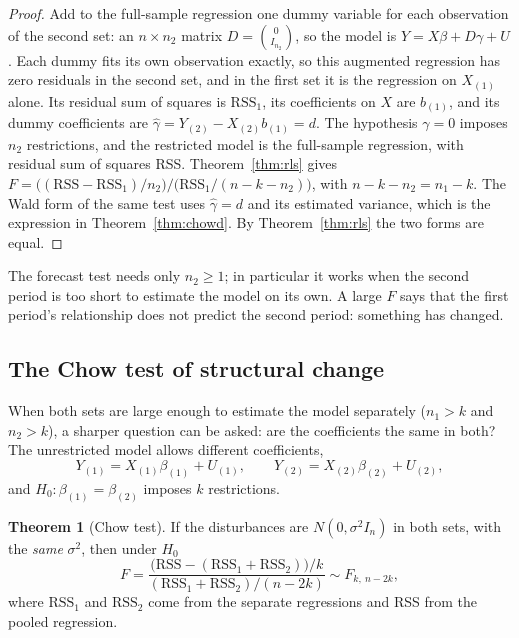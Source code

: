 \documentclass[11pt,a4paper]{article}
\numberwithin{equation}{section}
\theoremstyle{definition}
\newtheorem{thm}{Theorem}[subsection]
\begin{document}
\begin{proof}
Add to the full-sample regression one dummy variable for each observation of the second set: an $n \times n_2$ matrix $D = \binom{0}{I_{n_2}}$, so the model
is $Y = X\beta + D\gamma + U$. Each dummy fits its own observation exactly, so this augmented regression has zero residuals in the second set, and in
the first set it is the regression on $X_{(1)}$ alone. Its residual sum of squares is $\text{RSS}_1$, its coefficients on $X$ are $b_{(1)}$, and its dummy
coefficients are $\hat\gamma = Y_{(2)} - X_{(2)}b_{(1)} = d$. The hypothesis $\gamma = 0$ imposes $n_2$ restrictions, and the restricted model is the full-sample
regression, with residual sum of squares RSS. Theorem~\ref{thm:rls} gives $F = \bigl((\text{RSS} - \text{RSS}_1)/n_2\bigr)\big/\bigl(\text{RSS}_1/(n - k - n_2)\bigr)$, with
$n - k - n_2 = n_1 - k$. The Wald form of the same test uses $\hat\gamma = d$ and its estimated variance, which is the expression in Theorem~\ref{thm:chowd}. By
Theorem~\ref{thm:rls} the two forms are equal.
\end{proof}

The forecast test needs only $n_2 \geq 1$; in particular it works when the second period is too short to estimate the model on its own. A large $F$
says that the first period's relationship does not predict the second period: something has changed.

\subsection{The Chow test of structural change}
\label{ssec:chowb}

When both sets are large enough to estimate the model separately ($n_1 > k$ and $n_2 > k$), a sharper question can be asked: are the coefficients the
same in both? The unrestricted model allows different coefficients,
\[
Y_{(1)} = X_{(1)}\beta_{(1)} + U_{(1)}, \qquad Y_{(2)} = X_{(2)}\beta_{(2)} + U_{(2)} ,
\]
and $H_0\colon \beta_{(1)} = \beta_{(2)}$ imposes $k$ restrictions.

\begin{thm}[Chow test]
\label{thm:chowbreak}
If the disturbances are $N(0, \sigma^2I_n)$ in both sets, with the \emph{same} $\sigma^2$, then under $H_0$
\[
F = \frac{\bigl(\text{RSS} - (\text{RSS}_1 + \text{RSS}_2)\bigr)/k}{(\text{RSS}_1 + \text{RSS}_2)/(n - 2k)} \sim F_{k,\ n-2k} ,
\]
where $\text{RSS}_1$ and $\text{RSS}_2$ come from the separate regressions and RSS from the pooled regression.
\end{thm}
\end{document}
